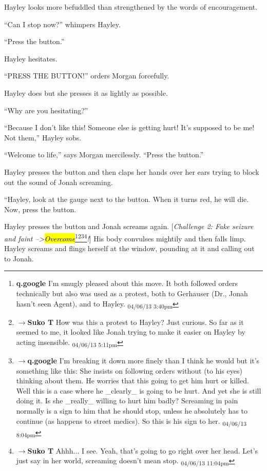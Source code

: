 Hayley looks more befuddled than strengthened by the words of encouragement.

``Can I stop now?'' whimpers Hayley.

``Press the button.''

Hayley hesitates.

``PRESS THE BUTTON!'' orders Morgan forcefully.

Hayley does but she presses it as lightly as possible.

``Why are you hesitating?''

``Because I don't like this!  Someone else is getting hurt! It's supposed to be me!  Not them,'' Hayley sobs.

``Welcome to life,'' says Morgan mercilessly.  ``Press the button.''

Hayley presses the button and then claps her hands over her ears trying to block out the sound of Jonah screaming.

``Hayley, look at the gauge next to the button.  When it turns red, he will die.  Now, press the button.

Hayley presses the button and Jonah screams again. {[}\textit{Challenge 2: Fake seizure and faint --\textgreater  }\textit{\hl{Overcome}}\footnote{\textbf{q.google }I'm smugly pleased about this move.  It both followed orders technically but also was used as a protest, both to Gerhauser (Dr., Jonah hasn't seen Agent), and to Hayley. \textsubscript{04/06/13 3:40pm}}\footnote{$\rightarrow$\textbf{Suko T }How was this a protest to Hayley?  Just curious.  So far as it seemed to me, it looked like Jonah trying to make it easier on Hayley by acting insensible. \textsubscript{04/06/13 5:11pm}}\footnote{$\rightarrow$\textbf{q.google }I'm breaking it down more finely than I think he would but it's something like this: She insists on following orders without (to his eyes) thinking about them.  He worries that this going to get him hurt or killed.  Well this is a case where he \_clearly\_ is going to be hurt.  And yet she is still doing it.  Is she \_really\_ willing to hurt him badly?  Screaming in pain normally is a sign to him that he should stop, unless he absolutely has to continue (as happens to street medics).  So this is his sign to her. \textsubscript{04/06/13 8:04pm}}\footnote{$\rightarrow$\textbf{Suko T }Ahhh... I see. Yeah, that's going to go right over her head.  Let's just say in her world, screaming doesn't mean stop. \textsubscript{04/06/13 11:04pm}}\textit{!}{]}  His body convulses mightily and then falls limp.  Hayley screams and flings herself at the window, pounding at it and calling out to Jonah.

